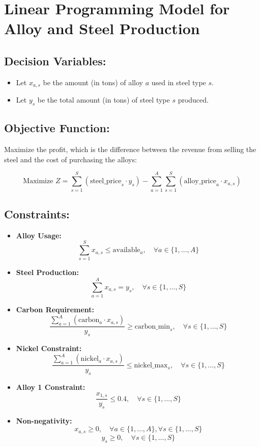 \documentclass{article}
\begin{document}
\section*{Linear Programming Model for Alloy and Steel Production}

\subsection*{Decision Variables:}
\begin{itemize}
    \item Let \( x_{a,s} \) be the amount (in tons) of alloy \( a \) used in steel type \( s \).
    \item Let \( y_s \) be the total amount (in tons) of steel type \( s \) produced.
\end{itemize}

\subsection*{Objective Function:}
Maximize the profit, which is the difference between the revenue from selling the steel and the cost of purchasing the alloys:

\[
\text{Maximize } Z = \sum_{s=1}^{S} \left( \text{steel\_price}_s \cdot y_s \right) - \sum_{a=1}^{A} \sum_{s=1}^{S} \left( \text{alloy\_price}_a \cdot x_{a,s} \right)
\]

\subsection*{Constraints:}

\begin{itemize}
    \item \textbf{Alloy Usage:}
    \[
    \sum_{s=1}^{S} x_{a,s} \leq \text{available}_a, \quad \forall a \in \{1, \ldots, A\}
    \]

    \item \textbf{Steel Production:}
    \[
    \sum_{a=1}^{A} x_{a,s} = y_s, \quad \forall s \in \{1, \ldots, S\}
    \]

    \item \textbf{Carbon Requirement:}
    \[
    \frac{\sum_{a=1}^{A} \left( \text{carbon}_a \cdot x_{a,s} \right)}{y_s} \geq \text{carbon\_min}_s, \quad \forall s \in \{1, \ldots, S\}
    \]

    \item \textbf{Nickel Constraint:}
    \[
    \frac{\sum_{a=1}^{A} \left( \text{nickel}_a \cdot x_{a,s} \right)}{y_s} \leq \text{nickel\_max}_s, \quad \forall s \in \{1, \ldots, S\}
    \]

    \item \textbf{Alloy 1 Constraint:}
    \[
    \frac{x_{1,s}}{y_s} \leq 0.4, \quad \forall s \in \{1, \ldots, S\}
    \]

    \item \textbf{Non-negativity:}
    \[
    x_{a,s} \geq 0, \quad \forall a \in \{1, \ldots, A\}, \forall s \in \{1, \ldots, S\}
    \]
    \[
    y_s \geq 0, \quad \forall s \in \{1, \ldots, S\}
    \]
\end{itemize}
\end{document}
